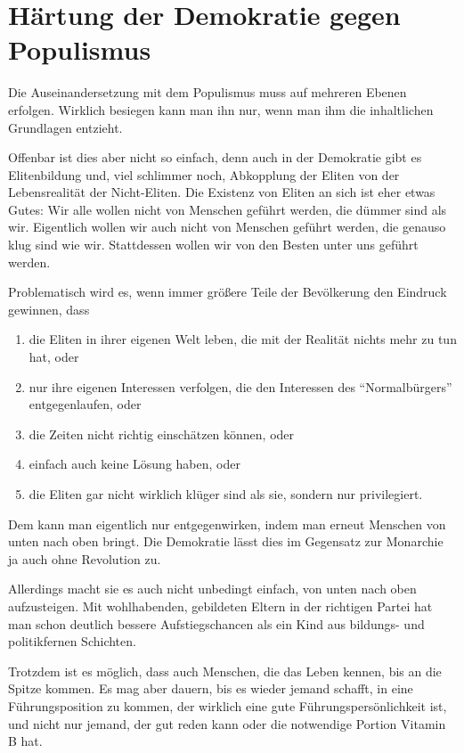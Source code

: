 \section{Härtung der Demokratie gegen Populismus} \label{sec:haertung_der_demokratie}

Die Auseinandersetzung mit dem Populismus muss auf mehreren Ebenen erfolgen.
Wirklich besiegen kann man ihn nur, wenn man ihm die inhaltlichen Grundlagen entzieht.

Offenbar ist dies aber nicht so einfach, denn auch in der Demokratie gibt es Elitenbildung und, viel schlimmer noch, Abkopplung der Eliten von der Lebensrealität der Nicht-Eliten.
Die Existenz von Eliten an sich ist eher etwas Gutes: Wir alle wollen nicht von Menschen geführt werden, die dümmer sind als wir.
Eigentlich wollen wir auch nicht von Menschen geführt werden, die genauso klug sind wie wir.
Stattdessen wollen wir von den Besten unter uns geführt werden.

Problematisch wird es, wenn immer größere Teile der Bevölkerung den Eindruck gewinnen, dass
\begin{enumerate}[label=\alph*)]
    \item die Eliten in ihrer eigenen Welt leben, die mit der Realität nichts mehr zu tun hat, oder
    \item nur ihre eigenen Interessen verfolgen, die den Interessen des \enquote{Normalbürgers} entgegenlaufen, oder
    \item die Zeiten nicht richtig einschätzen können, oder
    \item einfach auch keine Lösung haben, oder
    \item die Eliten gar nicht wirklich klüger sind als sie, sondern nur privilegiert.
\end{enumerate}

Dem kann man eigentlich nur entgegenwirken, indem man erneut Menschen von unten nach oben bringt.
Die Demokratie lässt dies im Gegensatz zur Monarchie ja auch ohne Revolution zu.

Allerdings macht sie es auch nicht unbedingt einfach, von unten nach oben aufzusteigen.
Mit wohlhabenden, gebildeten Eltern in der richtigen Partei hat man schon deutlich bessere Aufstiegschancen als ein Kind aus bildungs- und politikfernen Schichten.

Trotzdem ist es möglich, dass auch Menschen, die das Leben kennen, bis an die Spitze kommen.
Es mag aber dauern, bis es wieder jemand schafft, in eine Führungsposition zu kommen, der wirklich eine gute Führungspersönlichkeit ist, und nicht nur jemand, der gut reden kann oder die notwendige Portion Vitamin B hat.

